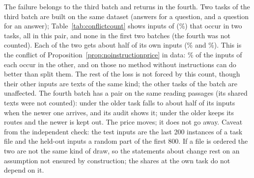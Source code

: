 \begin{table}[t]
  \caption{Fresh tasks: each rule read once on a batch of 30 tasks that nothing had used. Means over the 30 tasks, in \%: own task at arrival and after the last task; routes changed; audit $H/m$ and 95\% bound where the rule has an audit. Verdict: use / guarantee by the lines in the text. Last column: number of tasks below 70\% own task.}
  \label{tab:recogniserfresh}
  \centering
  
\end{table}

The failure belongs to the third batch and returns in the fourth. Two tasks of the third batch are built on the same dataset (answers for a question, and a question for an answer); Table~\ref{tab:conflictcount} shows \AudConfFiveShared{} inputs of \AudConfFiveInputs{} (\AudConfFiveShare{}\%) that occur in two tasks, all in this pair, and none in the first two batches (the fourth was not counted). Each of the two gets about half of its own inputs (\AudFreshThirdPairLow{}\% and \AudFreshThirdPairHigh{}\%). This is the conflict of Proposition~\ref{prop:noinstructionprice} in data: \AudConfPairShare{}\% of the inputs of each occur in the other, and on those no method without instructions can do better than split them. The rest of the loss is not forced by this count, though their other inputs are texts of the same kind; the other tasks of the batch are unaffected.
The fourth batch has a pair on the same reading passages (its shared texts were not counted): under \recog{} the older task falls to about half of its inputs when the newer one arrives, and its audit shows it; under \handicap{} the older keeps its routes and the newer is kept out. The price moves; it does not go away.
Caveat from the independent check: the test inputs are the last 200 instances of a task file and the held-out inputs a random part of the first 800. If a file is ordered the two are not the same kind of draw, so the statements about change rest on an assumption not ensured by construction; the shares at the own task do not depend on it.

